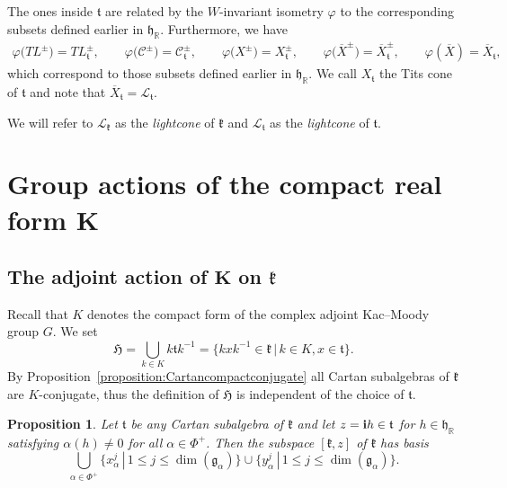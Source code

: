 \documentclass[11pt]{article}
\numberwithin{equation}{section}
\numberwithin{equation}{section}
\newtheorem{Proposition}[Theorem]{Proposition}
 { \theoremstyle{definition}
\newtheorem{Definition}[Theorem]{Definition}
\newtheorem{Remark}[Theorem]{Remark} }
\def\R{\mathbb{R}}
\def\bi{{\bf i}}
\def\cC{\mathcal C}
\def\cL{\mathcal L}
\def\g{\mathfrak{g}}
\def\h{\mathfrak{h}}
\def\fH{\mathfrak{H}}
\def\k{\mathfrak{k}}
\def\fk{\mathfrak{k}}
\def\ft{\mathfrak{t}}
\begin{document}
The ones inside $\ft$ are related by the $W$-invariant isometry $\varphi$ to the corresponding subsets defined earlier in $\h_\R$.
Furthermore, we have
\begin{gather*} \varphi\big(TL^\pm\big) = TL_\ft^\pm,\qquad\! \varphi\big(\cC^\pm\big) = \cC_\ft^\pm,\qquad\! \varphi\big(X^\pm\big) = X_\ft^\pm,\qquad\!
\varphi\big(\overline{X}^\pm\big) = \overline{X}_\ft^\pm,\qquad\! \varphi(\overline{X}) = \overline{X}_\ft,
\end{gather*}
which correspond to those subsets defined earlier in $\h_\R$. We call $X_{\ft}$ the Tits cone of $\ft$ and note that $\overline{X}_\ft = \cL_{\ft}$.

\begin{Remark}\label{remark:lightconecompactform}
We will refer to $\cL_{\k}$ as the {\em lightcone} of $\k$ and $\cL_{\ft}$ as the {\em lightcone} of $\ft$.
\end{Remark}

\section[Group actions of the compact real form $K$]{Group actions of the compact real form $\boldsymbol{K}$}

\subsection[The adjoint action of $K$ on $\k$]{The adjoint action of $\boldsymbol{K}$ on $\boldsymbol{\k}$}\label{subsection:globalstructureAdjointaction}

Recall that $K$ denotes the compact form of the complex adjoint Kac--Moody group $G$. We set
\[\fH = \bigcup_{k\in K} k \ft k^{-1} = \big\{k x k^{-1}\in \fk \,|\, k\in K, x \in \ft\big\}.\]
By Proposition~\ref{proposition:Cartancompactconjugate} all Cartan subalgebras of $\k$ are $K$-conjugate, thus the definition of $\mathfrak{H}$ is independent of the choice of $\ft$.

\begin{Proposition}\label{proposition:tangentspace}Let $\ft$ be any Cartan subalgebra of $\k$ and let $z = \bi h\in\ft$ for $h\in\h_\R$ satisfying $\alpha(h)\neq 0$ for all $\alpha\in\Phi^+$.
Then the subspace $[\k,z]$ of $\k$ has basis
\[\bigcup_{\alpha\in\Phi^+} \big\{ x_{\alpha}^{j}\, |\, 1\leq j\leq \dim (\g_{\alpha})\big\} \cup
 \big\{ y_{\alpha}^{j} \, |\, 1\leq j\leq \dim (\g_{\alpha}) \big\}.\]
\end{Proposition}
\end{document}
